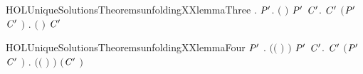 \newcommand{\HOLUniqueSolutionsTheoremsunfoldingXXlemmaTwo}{\UseVerbatim{HOLUniqueSolutionsTheoremsunfoldingXXlemmaTwo}}
\begin{SaveVerbatim}{HOLUniqueSolutionsTheoremsunfoldingXXlemmaThree}
\HOLTokenTurnstile{} \HOLSymConst{\HOLTokenForall{}} .
         \HOLSymConst{\HOLTokenConj{}}   \HOLSymConst{\HOLTokenImp{}}
       \HOLSymConst{\HOLTokenForall{}}  \ensuremath{\HOLBoundVar{P}\sp{\prime}}.
            \ensuremath{(} \ensuremath{)} \HOLTokenTransBegin{}\HOLTokenTransEnd \ensuremath{\HOLBoundVar{P}\sp{\prime}} \HOLSymConst{\HOLTokenImp{}}
           \HOLSymConst{\HOLTokenExists{}}\ensuremath{\HOLBoundVar{C}\sp{\prime}}.  \ensuremath{\HOLBoundVar{C}\sp{\prime}} \HOLSymConst{\HOLTokenConj{}} \ensuremath{(}\ensuremath{\HOLBoundVar{P}\sp{\prime}} \HOLSymConst{\ensuremath{=}} \ensuremath{\HOLBoundVar{C}\sp{\prime}} \ensuremath{)} \HOLSymConst{\HOLTokenConj{}} \HOLSymConst{\HOLTokenForall{}}.  \ensuremath{(} \ensuremath{)} \HOLTokenTransBegin{}\HOLTokenTransEnd \ensuremath{\HOLBoundVar{C}\sp{\prime}} 
\end{SaveVerbatim}
\newcommand{\HOLUniqueSolutionsTheoremsunfoldingXXlemmaThree}{\UseVerbatim{HOLUniqueSolutionsTheoremsunfoldingXXlemmaThree}}
\begin{SaveVerbatim}{HOLUniqueSolutionsTheoremsunfoldingXXlemmaFour}
\HOLTokenTurnstile{} \HOLSymConst{\HOLTokenForall{}}    \ensuremath{\HOLBoundVar{P}\sp{\prime}} .
         \HOLSymConst{\HOLTokenConj{}}   \HOLSymConst{\HOLTokenConj{}}  \ensuremath{(}\ensuremath{(} \HOLConst{\HOLTokenCompose}   \ensuremath{)} \ensuremath{)}  \ensuremath{\HOLBoundVar{P}\sp{\prime}} \HOLSymConst{\HOLTokenConj{}}
         \HOLSymConst{\HOLTokenLeq{}}  \HOLSymConst{\HOLTokenImp{}}
       \HOLSymConst{\HOLTokenExists{}}\ensuremath{\HOLBoundVar{C}\sp{\prime}}.
            \ensuremath{\HOLBoundVar{C}\sp{\prime}} \HOLSymConst{\HOLTokenConj{}} \ensuremath{(}\ensuremath{\HOLBoundVar{P}\sp{\prime}} \HOLSymConst{\ensuremath{=}} \ensuremath{\HOLBoundVar{C}\sp{\prime}} \ensuremath{)} \HOLSymConst{\HOLTokenConj{}}
           \HOLSymConst{\HOLTokenForall{}}.  \ensuremath{(}\ensuremath{(} \HOLConst{\HOLTokenCompose}   \ensuremath{)} \ensuremath{)}  \ensuremath{(}\ensuremath{\HOLBoundVar{C}\sp{\prime}} \ensuremath{)}
\end{SaveVerbatim}
